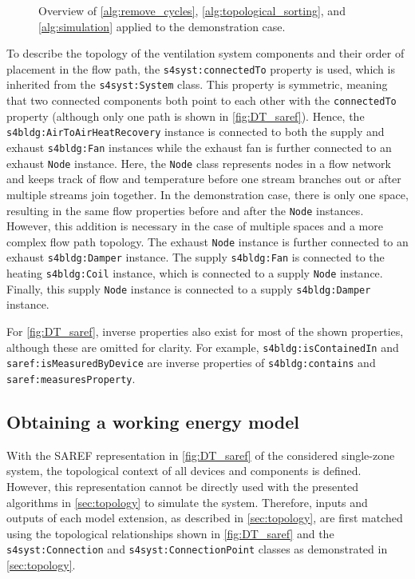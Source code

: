 \begin{figure*}[t!]
    \centering
    
    \caption{Overview of \autoref{alg:remove_cycles}, \autoref{alg:topological_sorting}, and \autoref{alg:simulation} applied to the demonstration case.}
    \label{fig:Topology_1space_1v_1h_0c}
\end{figure*}

To describe the topology of the ventilation system components and their order of placement in the flow path, the \texttt{s4syst:connectedTo} property is used, which is inherited from the \texttt{s4syst:System} class. This property is symmetric, meaning that two connected components both point to each other with the \texttt{connectedTo} property (although only one path is shown in \autoref{fig:DT_saref}). Hence, the \texttt{s4bldg:AirToAirHeatRecovery} instance is connected to both the supply and exhaust \texttt{s4bldg:Fan} instances while the exhaust fan is further connected to an exhaust \texttt{Node} instance. 
Here, the \texttt{Node} class represents nodes in a flow network and keeps track of flow and temperature before one stream branches out or after multiple streams join together. In the demonstration case, there is only one space, resulting in the same flow properties before and after the \texttt{Node} instances. However, this addition is necessary in the case of multiple spaces and a more complex flow path topology. The exhaust \texttt{Node} instance is further connected to an exhaust \texttt{s4bldg:Damper} instance. The supply \texttt{s4bldg:Fan} is connected to the heating \texttt{s4bldg:Coil} instance, which is connected to a supply \texttt{Node} instance. Finally, this supply \texttt{Node} instance is connected to a supply \texttt{s4bldg:Damper} instance. 

For \autoref{fig:DT_saref}, inverse properties also exist for most of the shown properties, although these are omitted for clarity. For example, \texttt{s4bldg:isContainedIn} and \texttt{saref:isMeasuredByDevice} are inverse properties of \texttt{s4bldg:contains} and \texttt{saref:measuresProperty}. 




\subsection{Obtaining a working energy model}
With the SAREF representation in \autoref{fig:DT_saref} of the considered single-zone system, the topological context of all devices and components is defined. However, this representation cannot be directly used with the presented algorithms in \autoref{sec:topology} to simulate the system. Therefore, inputs and outputs of each model extension, as described in \autoref{sec:topology}, are first matched using the topological relationships shown in \autoref{fig:DT_saref} and the \texttt{s4syst:Connection} and \texttt{s4syst:ConnectionPoint} classes as demonstrated in \autoref{sec:topology}. 




